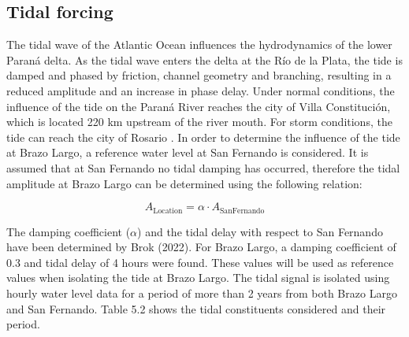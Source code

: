\subsection{Tidal forcing}
\label{sec:tidal forcing}
The tidal wave of the Atlantic Ocean influences the hydrodynamics of the lower Paraná delta. As the tidal wave enters the delta at the Río de la Plata, the tide is damped and phased by friction, channel geometry and branching, resulting in a reduced amplitude and an increase in phase delay. Under normal conditions, the influence of the tide on the Paraná River reaches the city of Villa Constitución, which is located 220 km upstream of the river mouth. For storm conditions, the tide can reach the city of Rosario \autocite{balayCausesPeriodicityLarge2018}. In order to determine the influence of the tide at Brazo Largo, a reference water level at San Fernando is considered. It is assumed that at San Fernando no tidal damping has occurred, therefore the tidal amplitude at Brazo Largo can be determined using the following relation:

\begin{equation}
    A_{\text{Location}} = \alpha \cdot A_{\text{SanFernando}}
\end{equation}

The damping coefficient ($\alpha$) and the tidal delay with respect to San Fernando have been determined by Brok (2022). For Brazo Largo, a damping coefficient of 0.3 and tidal delay of 4 hours were found. These values will be used as reference values when isolating the tide at Brazo Largo. The tidal signal is isolated using hourly water level data for a period of more than 2 years from both Brazo Largo and San Fernando. Table 5.2 shows the tidal constituents  considered and their period.

